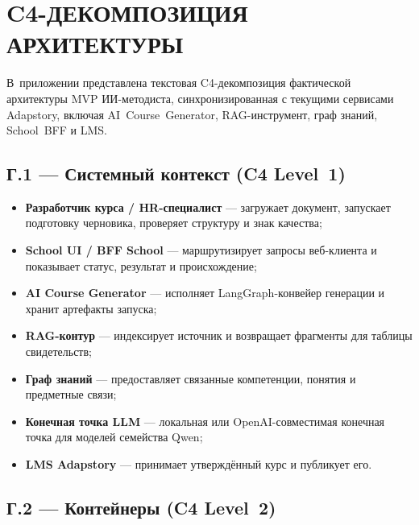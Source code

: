 \chapter{C4-ДЕКОМПОЗИЦИЯ АРХИТЕКТУРЫ}

В~приложении представлена текстовая C4-декомпозиция фактической
архитектуры MVP ИИ-методиста, синхронизированная с текущими сервисами
Adapstory, включая AI~Course~Generator, RAG-инструмент, граф знаний,
School~BFF и LMS.

\section*{Г.1 — Системный контекст (C4 Level~1)}

\begin{itemize}
  \item \textbf{Разработчик курса / HR-специалист} — загружает документ,
    запускает подготовку черновика, проверяет структуру и знак качества;
  \item \textbf{School UI / BFF School} — маршрутизирует запросы
    веб-клиента и показывает статус, результат и происхождение;
  \item \textbf{AI Course Generator} — исполняет LangGraph-конвейер
    генерации и хранит артефакты запуска;
  \item \textbf{RAG-контур} — индексирует источник и возвращает
    фрагменты для таблицы свидетельств;
  \item \textbf{Граф знаний} — предоставляет связанные компетенции,
    понятия и предметные связи;
  \item \textbf{Конечная точка LLM} — локальная или OpenAI-совместимая конечная точка
    для моделей семейства Qwen;
  \item \textbf{LMS Adapstory} — принимает утверждённый курс и
    публикует его.
\end{itemize}

\section*{Г.2 — Контейнеры (C4 Level~2)}


